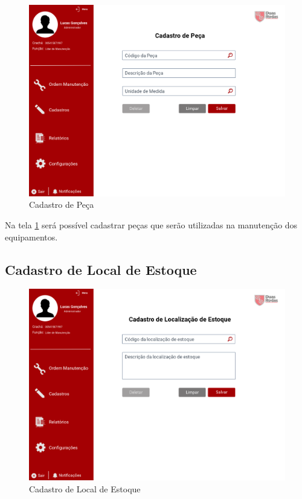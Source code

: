 \begin{figure}[htb]
	\caption{\label{web_cad-peca}Cadastro de Peça}
	\begin{center}
		\includegraphics[scale=0.55]{./Figuras/web/cad-peca.png}
	\end{center}
\end{figure}

Na tela \ref{web_cad-peca} será possível cadastrar peças que serão utilizadas na manutenção dos equipamentos.

\newpage
\subsection{Cadastro de Local de Estoque}

\begin{figure}[htb]
	\caption{\label{web_cad-loc-estoque}Cadastro de Local de Estoque}
	\begin{center}
		\includegraphics[scale=0.55]{./Figuras/web/cad-loc-estoque.png}
	\end{center}
\end{figure}

